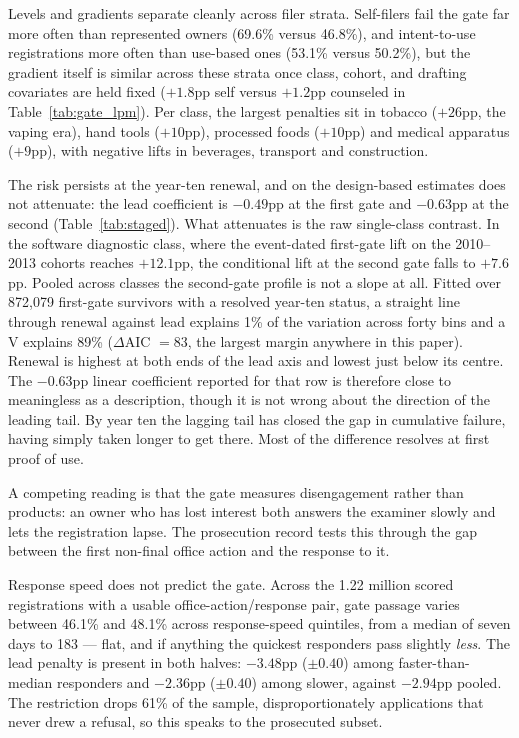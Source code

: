Levels and gradients separate cleanly across filer strata. Self-filers
fail the gate far more often than represented owners (69.6\% versus
46.8\%), and intent-to-use registrations more often than use-based ones
(53.1\% versus 50.2\%),
but the \dkl{} gradient itself is similar across these strata once class,
cohort, and drafting covariates are held fixed ($+1.8$pp self versus
$+1.2$pp counseled in Table~\ref{tab:gate_lpm}). Per class, the largest penalties sit in tobacco ($+26$pp, the
vaping era), hand tools ($+10$pp), processed foods ($+10$pp) and medical
apparatus ($+9$pp), with negative lifts in beverages, transport and
construction.

The risk persists at the year-ten renewal, and on the design-based
estimates does not attenuate: the lead coefficient is $-0.49$pp at the first
gate and $-0.63$pp at the second (Table~\ref{tab:staged}). What attenuates is
the raw single-class contrast. In the
software diagnostic class, where the event-dated first-gate lift on the
2010--2013 cohorts reaches $+12.1$pp, the conditional lift at the second
gate falls to $+7.6$pp. Pooled across classes the second-gate profile is not
a slope at all. Fitted over 872{,}079 first-gate survivors with a resolved
year-ten status, a straight line through renewal against lead explains 1\% of
the variation across forty bins and a V explains 89\%
($\Delta$AIC $= 83$, the largest margin anywhere in this paper). Renewal is
highest at both ends of the lead axis and lowest just below its centre. The
$-0.63$pp linear coefficient reported for that row is therefore close to
meaningless as a description, though it is not wrong about the direction of the
leading tail. By year ten the lagging tail has closed the gap in cumulative
failure, having simply taken longer to get there. Most of the difference
resolves at first proof of use.

A competing reading is that the gate measures disengagement rather than
products: an owner who has lost interest both answers the examiner slowly
and lets the registration lapse. The prosecution record tests this through
the gap between the first non-final office action and the response to it.

Response speed does not predict the gate. Across the 1.22 million scored
registrations with a usable office-action/response pair, gate passage varies
between 46.1\% and 48.1\% across response-speed quintiles, from a median of
seven days to 183 --- flat, and if anything the quickest responders pass
slightly \emph{less}. The lead penalty is present in both halves: $-3.48$pp
($\pm 0.40$) among faster-than-median responders and $-2.36$pp ($\pm 0.40$)
among slower, against $-2.94$pp pooled. The restriction drops 61\% of
the sample, disproportionately applications that never drew a refusal, so
this speaks to the prosecuted subset.

